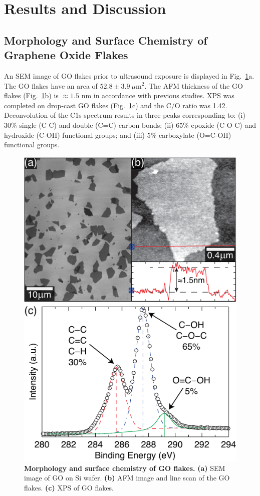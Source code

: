 \section{Results and Discussion}

\subsection{Morphology and Surface Chemistry of Graphene Oxide Flakes}

An SEM image of GO flakes prior to ultrasound exposure is displayed in Fig.~\ref{fig2}a. The GO flakes have an area of $52.8 \pm 3.9\ \mu$m$^{2}$. The AFM thickness of the GO flakes (Fig.~\ref{fig2}b) is $\approx 1.5$ nm in accordance with previous studies.\cite{Zhou2009,Compton2010} XPS was completed on drop-cast GO flakes (Fig.~\ref{fig2}c) and the C/O ratio was 1.42. Deconvolution of the C1s spectrum results in three peaks corresponding to: (i) 30\% single (C-C) and double (C=C) carbon bonds; (ii) 65\% epoxide (C-O-C) and hydroxide (C-OH) functional groups; and (iii) 5\% carboxylate (O=C-OH) functional groups.

\begin{figure}[t!]
  \centering
  \includegraphics{paper1/Fig2.pdf}
  \caption{\textbf{Morphology and surface chemistry of GO flakes.} \textbf{(a)} SEM image of GO on Si wafer. \textbf{(b)} AFM image and line scan of the GO flakes. \textbf{(c)} XPS of GO flakes.}
  \label{fig2}
\end{figure}

